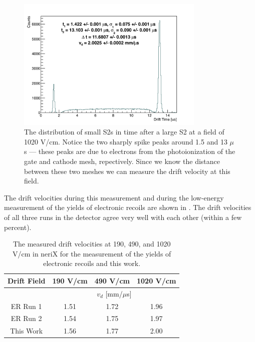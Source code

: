 \begin{figure}[t]
        \centering
	\includegraphics[width=0.8\textwidth]{nerix_drift_velocity}
	\caption{The distribution of small S2s in time after a large S2 at a field of 1020 V/cm.  Notice the two sharply spike peaks around 1.5 and 13 $\mu$s --- these peaks are due to electrons from the photoionization of the gate and cathode mesh, repectively.  Since we know the distance between these two meshes we can measure the drift velocity at this field.}
	\label{fig:nerix_drift_velocity}
\end{figure}


The drift velocities during this measurement and during the low-energy measurement of the yields of electronic recoils \cite{goetzke2016measurement} are shown in .  The drift velocities of all three runs in the detector agree very well with each other (within a few percent).

\begin{table}[b]
\centering
\def\arraystretch{1.3}
\begin{tabular}{cccc}
\hline
Drift Field & 190 V/cm & 490 V/cm & 1020 V/cm \\
\hline
 & \multicolumn{3}{c}{$v_d$ [mm/$\mu$s]} \\
\hline
ER Run 1 & 1.51 & 1.72 & 1.96 \\
ER Run 2 & 1.54 & 1.75 & 1.97 \\
This Work & 1.56 & 1.77 & 2.00 \\
\hline
\end{tabular}
\caption{The measured drift velocities at 190, 490, and 1020 V/cm in neriX for the measurement of the yields of electronic recoils \cite{goetzke2016measurement} and this work.}
\label{tab:nerix_drift_velocities}
\end{table}


